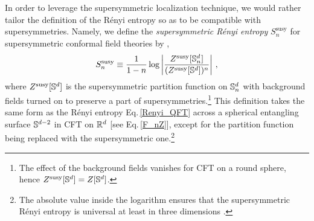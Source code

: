 In order to leverage the supersymmetric localization technique, we would rather tailor the definition of the R{\'e}nyi entropy so as to be compatible with supersymmetries.
Namely, we define the \emph{supersymmetric R{\'e}nyi entropy} $S_n^\text{susy}$ for supersymmetric conformal field theories by \cite{Nishioka:2013haa},
\begin{align}\label{SRE_def}
	S_n^\text{susy} \equiv \frac{1}{1-n} \log \bigg| \frac{Z^\text{susy}[\mathbb{S}^d_n]}{(Z^\text{susy}[\mathbb{S}^d])^n} \bigg| \ ,
\end{align}
where $Z^\text{susy}[\mathbb{S}^d]$ is the supersymmetric partition function on $\mathbb{S}^d_n$ with background fields turned on to preserve a part of supersymmetries.\footnote{The effect of the background fields vanishes for CFT on a round sphere, hence $Z^\text{susy}[\mathbb{S}^d] = Z[\mathbb{S}^d]$.}
This definition takes the same form as the R{\'e}nyi entropy Eq.\,\eqref{Renyi_QFT} across a spherical entangling surface $\mathbb{S}^{d-2}$ in CFT on $\mathbb{R}^d$ [see Eq.\,\eqref{F_nZ}], except for the partition function being replaced with the supersymmetric one.\footnote{
The absolute value inside the logarithm ensures that the supersymmetric R{\'e}nyi entropy is universal at least in three dimensions \cite{Closset:2012vg}.}

